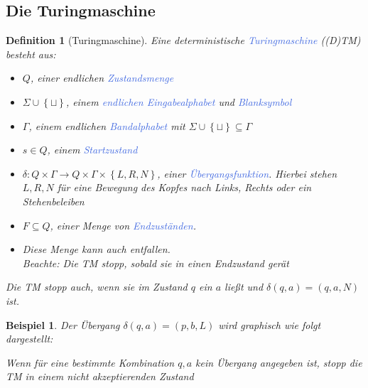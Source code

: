 \documentclass[11pt]{article}
\newcommand{\tcol}[1]{\textcolor{RoyalBlue}{#1}}
\newcommand{\set}[1]{\left\lbrace #1\right\rbrace}
\theoremstyle{break}
\newtheorem{defi}[satz]{Definition}
\newtheorem{beis}[satz]{Beispiel}
\begin{document}
    \subsection{Die Turingmaschine}
	\label{subsec:die-turingmaschineindex}

    \begin{defi}[Turingmaschine]
        Eine deterministische \tcol{Turingmaschine} ((D)TM) besteht aus:
        \begin{itemize}
            \item $Q$, einer endlichen \tcol{Zustandsmenge}
            \item $\Sigma\cup\set{\sqcup}$, einem \tcol{endlichen Eingabealphabet} und \tcol{Blanksymbol}
            \item $\Gamma$, einem endlichen \tcol{Bandalphabet} mit $\Sigma\cup\set{\sqcup}\subseteq\Gamma$
            \item $s\in Q$, einem \tcol{Startzustand}
            \item $\delta\colon Q\times\Gamma\to Q\times \Gamma\times\set{L,R,N}$, einer \tcol{Übergangsfunktion}.
                Hierbei stehen $L,R,N$ für eine Bewegung des Kopfes nach Links, Rechts oder ein Stehenbeleiben
            \item $F\subseteq Q$, einer Menge von \tcol{Endzuständen}.
            \item Diese Menge kann auch entfallen.\\
            Beachte: Die TM stopp, sobald sie in einen Endzustand gerät
        \end{itemize}
        Die TM stopp auch, wenn sie im Zustand $q$ ein $a$ ließt und $\delta(q,a)=(q,a,N)$ ist.
    \end{defi}

    \begin{beis}
        Der Übergang $\delta(q,a)=(p,b,L)$ wird graphisch wie folgt dargestellt:
        \begin{center}
        \end{center}
        Wenn für eine bestimmte Kombination $q,a$ kein Übergang angegeben ist, stopp die TM in einem nicht akzeptierenden Zustand
    \end{beis}
\end{document}
